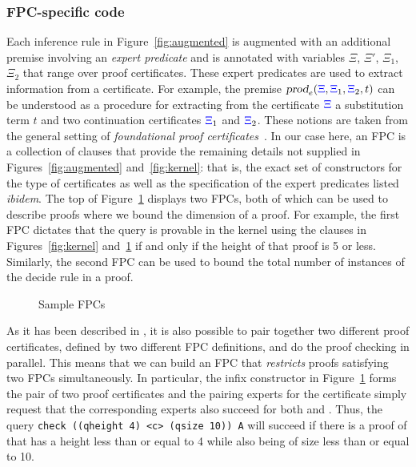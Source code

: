 \subsubsection{FPC-specific code}
\label{ssec:fpc}

Each inference rule in Figure~\ref{fig:augmented} is augmented with an
additional premise involving an \emph{expert predicate} and is
annotated with variables $\Xi$, $\Xi'$, $\Xi_1$, $\Xi_2$ that range
over proof certificates.  These expert predicates are used to extract
information from a certificate.  For example, the premise
$\hbox{\sl prod}_e({\color{blue}{\Xi}},{\color{blue}{\Xi}}_1,{\color{blue}{\Xi}}_2,t)$ can be understood as a procedure for
extracting from the certificate ${\color{blue}{\Xi}}$ a substitution term $t$ and two
continuation certificates ${\color{blue}{\Xi}}_1$ and ${\color{blue}{\Xi}}_2$.
%
These notions are taken from the general setting of \emph{foundational
  proof certificates}~\cite{chihani17jar}.
%
In our case here, an FPC is a collection of \lP clauses that provide
the remaining details not supplied in Figures~\ref{fig:augmented}
and~\ref{fig:kernel}: that is, the exact set of constructors for the
type of certificates  as well as the specification of the expert
predicates listed \emph{ibidem}.
%
The top of Figure~\ref{fig:resources} displays two FPCs,
both of which can be used to describe proofs where we bound
the dimension of  a proof.
%
For example, the first FPC dictates that the query \mbox{} is
provable in  the kernel using the clauses in Figures~\ref{fig:kernel}
and~\ref{fig:resources} if and only if the height of that proof is 5
or less.
%
Similarly, the second FPC can be used to bound the total number of
instances of the decide rule in a proof.
%

\begin{figure}[t]


\caption{Sample FPCs}
\label{fig:resources}
\end{figure}

As it has been described in \cite{blanco17cade}, it is also possible
to pair together two different proof certificates, defined by two
different FPC definitions, and do the proof checking in parallel.
This means that we can build an FPC that \emph{restricts} proofs
satisfying two FPCs simultaneously.  In particular, the infix
constructor  in Figure~\ref{fig:resources} forms the pair of
two proof certificates and the pairing experts for the certificate
 simply request that the corresponding experts
also succeed for both  and . Thus, the query
\verb+check ((qheight 4) <c> (qsize 10)) A+ will succeed if there is a
proof of  that has a height less than or equal to 4 while also
being of size less than or equal to 10.

